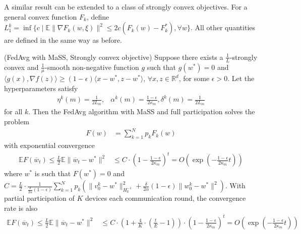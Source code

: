 %
A similar result can be extended to a class of strongly convex objectives.
For a general convex function $F_{k}$, define $L_{1}^{k}=\inf\{c\mid\mathbb{E}\|\nabla F_{k}(w,\xi)\|^{2}\leq2c(F_{k}(w)-F_{k}^{\ast}),\forall w\}$.
All other quantities are defined in the same way as before. 
\begin{theorem}
(FedAvg with MaSS, Strongly convex objective) Suppose there exists
a $\frac{1}{L}$-strongly convex and $\frac{1}{\mu}$-smooth non-negative
function $g$ such that $g(w^{\ast})=0$ and $\langle g(x),\nabla f(z)\rangle\geq(1-\epsilon)\langle x-w^{\ast},z-w^{\ast}\rangle$,
$\forall x,z\in\mathbb{R}^{d}$, for some $\epsilon>0$. Let the hyperparameters
satisfy 
\begin{align*}
\eta^{k}(m)=\frac{1}{2L_{m}}, & \alpha^{k}(m)=\frac{1-\epsilon}{2\kappa_{m}},\delta^{k}(m)=\frac{1}{2L_{m}}
\end{align*}
for all $k$. Then the FedAvg algorithm with MaSS and full participation
solves the problem 
\begin{align*}
F(w) & =\sum_{k=1}^{N}p_{k}F_{k}(w)
\end{align*}
with exponential convergence
\begin{align*}
\mathbb{E}F(\overline{w}_{t})\leq\frac{L}{2}\mathbb{E}\|\overline{w}_{t}-w^{\ast}\|^{2} & \leq C\cdot(1-\frac{1-\epsilon}{2\kappa_{m}})^{t}=O(\exp(-\frac{1-\epsilon}{2\kappa_{m}}t))
\end{align*}
 where $w^{\ast}$ is such that $F(w^{\ast})=0$ and $C=\frac{L}{2}\cdot\frac{1}{\frac{\delta}{2\alpha}(1-\epsilon)}\sum_{k=1}^{N}p_{k}(\|v_{0}^{k}-w^{\ast}\|_{H_{k}^{-1}}^{2}+\frac{\delta}{2\alpha}(1-\epsilon)\|w_{0}^{k}-w^{\ast}\|^{2})$.
With partial participation of $K$ devices each communication round,
the convergence rate is also 
\begin{align*}
\mathbb{E}F(\overline{w}_{t})\leq\frac{L}{2}\mathbb{E}\|\overline{w}_{t}-w^{\ast}\|^{2} & \leq C\cdot(1+\frac{4}{K}\cdot(\frac{t}{E}-1))\cdot(1-\frac{1-\epsilon}{2\kappa_{m}})^{t}=O(\exp(-\frac{1-\epsilon}{2\kappa_{m}}t))
\end{align*}
\end{theorem}